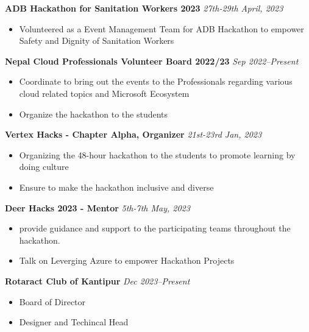 {\textbf{ADB Hackathon for Sanitation Workers 2023} \hfill \textit{27th-29th April, 2023}}\par
\begin{itemize}
	\item Volunteered as a Event Management Team for ADB Hackathon to empower Safety and Dignity of Sanitation Workers    
\end{itemize}\par

{\textbf{Nepal Cloud Professionals Volunteer Board 2022/23} \hfill \textit{Sep 2022--Present}}\par
\begin{itemize}
	\item Coordinate to bring out the events to the Professionals regarding various cloud related topics and Microsoft Ecosystem

 	\item Organize the hackathon to the students
    
\end{itemize}\par

{\textbf{Vertex Hacks - Chapter Alpha, Organizer} \hfill \textit{21st-23rd Jan, 2023}}\par
\begin{itemize}
	\item Organizing the 48-hour hackathon to the students to promote learning by doing culture
    \item Ensure to make the hackathon inclusive and diverse
\end{itemize}\par

{\textbf{Deer Hacks 2023 - Mentor} \hfill \textit{5th-7th May, 2023}}\par
\begin{itemize}
	\item provide guidance and support to the participating teams throughout the hackathon.
        \item Talk on Leverging Azure to empower Hackathon Projects
\end{itemize}\par

{\textbf{Rotaract Club of Kantipur} \hfill \textit{Dec 2023--Present}}\par
\begin{itemize}
 \item Board of Director
 \item Designer and Techincal Head
\end{itemize}\par

